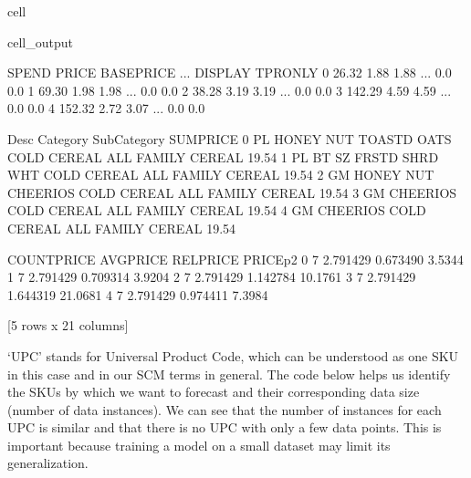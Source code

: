 \documentclass[letterpaper,10pt,english]{jupyterBook}
\begin{document}
\begin{sphinxuseclass}{cell}
\begin{sphinxVerbatimOutput}
\begin{sphinxuseclass}{cell_output}
\begin{sphinxVerbatim}[commandchars=\\\{\}]
    SPEND  PRICE  BASE\PYGZus{}PRICE  ...  DISPLAY  TPR\PYGZus{}ONLY  \PYGZbs{}
0   26.32   1.88        1.88  ...      0.0       0.0   
1   69.30   1.98        1.98  ...      0.0       0.0   
2   38.28   3.19        3.19  ...      0.0       0.0   
3  142.29   4.59        4.59  ...      0.0       0.0   
4  152.32   2.72        3.07  ...      0.0       0.0   

                       Desc     Category       Sub\PYGZhy{}Category SUMPRICE  \PYGZbs{}
0  PL HONEY NUT TOASTD OATS  COLD CEREAL  ALL FAMILY CEREAL    19.54   
1   PL BT SZ FRSTD SHRD WHT  COLD CEREAL  ALL FAMILY CEREAL    19.54   
2     GM HONEY NUT CHEERIOS  COLD CEREAL  ALL FAMILY CEREAL    19.54   
3               GM CHEERIOS  COLD CEREAL  ALL FAMILY CEREAL    19.54   
4               GM CHEERIOS  COLD CEREAL  ALL FAMILY CEREAL    19.54   

   COUNTPRICE  AVGPRICE  RELPRICE  PRICE\PYGZus{}p2  
0           7  2.791429  0.673490    3.5344  
1           7  2.791429  0.709314    3.9204  
2           7  2.791429  1.142784   10.1761  
3           7  2.791429  1.644319   21.0681  
4           7  2.791429  0.974411    7.3984  

[5 rows x 21 columns]
\end{sphinxVerbatim}

\end{sphinxuseclass}\end{sphinxVerbatimOutput}

\end{sphinxuseclass}
\sphinxAtStartPar
‘UPC’ stands for Universal Product Code, which can be understood as one SKU in this case and in our SCM terms in general. The code below helps us identify the SKUs by which we want to forecast and their corresponding data size (number of data instances). We can see that the number of instances for each UPC is similar and that there is no UPC with only a few data points. This is important because training a model on a small dataset may limit its generalization.
\end{document}

